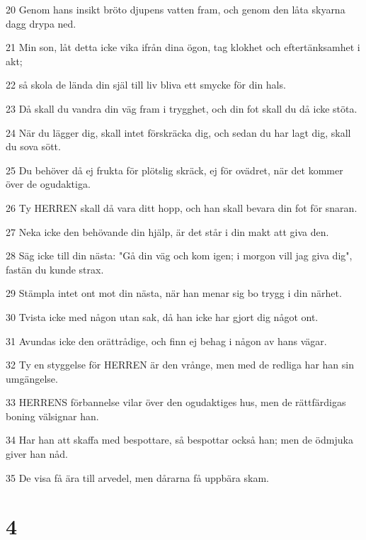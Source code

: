 \par 20 Genom hans insikt bröto djupens vatten fram, och genom den låta skyarna dagg drypa ned.
\par 21 Min son, låt detta icke vika ifrån dina ögon, tag klokhet och eftertänksamhet i akt;
\par 22 så skola de lända din själ till liv bliva ett smycke för din hals.
\par 23 Då skall du vandra din väg fram i trygghet, och din fot skall du då icke stöta.
\par 24 När du lägger dig, skall intet förskräcka dig, och sedan du har lagt dig, skall du sova sött.
\par 25 Du behöver då ej frukta för plötslig skräck, ej för ovädret, när det kommer över de ogudaktiga.
\par 26 Ty HERREN skall då vara ditt hopp, och han skall bevara din fot för snaran.
\par 27 Neka icke den behövande din hjälp, är det står i din makt att giva den.
\par 28 Säg icke till din nästa: "Gå din väg och kom igen; i morgon vill jag giva dig", fastän du kunde strax.
\par 29 Stämpla intet ont mot din nästa, när han menar sig bo trygg i din närhet.
\par 30 Tvista icke med någon utan sak, då han icke har gjort dig något ont.
\par 31 Avundas icke den orättrådige, och finn ej behag i någon av hans vägar.
\par 32 Ty en styggelse för HERREN är den vrånge, men med de redliga har han sin umgängelse.
\par 33 HERRENS förbannelse vilar över den ogudaktiges hus, men de rättfärdigas boning välsignar han.
\par 34 Har han att skaffa med bespottare, så bespottar också han; men de ödmjuka giver han nåd.
\par 35 De visa få ära till arvedel, men dårarna få uppbära skam.

\chapter{4}

